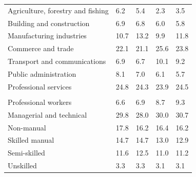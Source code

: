 \documentclass{article}
\begin{document}
\begin{table}[h]
\begin{tabular}{KTTTT}
    \hline
Agriculture, forestry and fishing  & 6.2& 5.4& 2.3& 3.5\\
Building and construction & 6.9& 6.8& 6.0& 5.8\\
Manufacturing industries & 10.7& 13.2&  9.9& 11.8\\
Commerce and trade  & 22.1& 21.1& 25.6& 23.8\\
Transport and communications  &  6.9&  6.7& 10.1&  9.2\\
Public administration & 8.1& 7.0& 6.1& 5.7\\
Professional services & 24.8& 24.3& 23.9& 24.5\\
\hline
    \\ 
    \hline
Professional workers  & 6.6& 6.9 & 8.7& 9.3\\
Managerial and technical & 29.8& 28.0& 30.0& 30.7\\
Non-manual & 17.8& 16.2& 16.4& 16.2\\
Skilled manual & 14.7& 14.7& 13.0& 12.9\\
Semi-skilled & 11.6& 12.5& 11.0& 11.2\\
Unskilled  & 3.3& 3.3& 3.1& 3.1\\
\end{tabular}
\end{table}
\pagebreak
\end{document}
